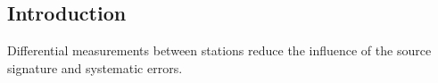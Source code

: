 \renewcommand{\pmk}{YuanYH\_2016\_GJI\_Double-difference adjoint tomography}
\renewcommand{\prf}{FWI/\pmk.pdf}
\renewcommand{\pti}{Double-difference adjoint seismic tomography}
\renewcommand{\pay}{Yanhua O. Yuan, Frederik J. Simons and Jeroen Tromp, 2016}
\renewcommand{\pjo}{Geophys. J. Int.}
\renewcommand{\pda}{2019/8/25 Sun.}

\section{\pinfo}

\subsection{Introduction}
Differential measurements between stations reduce the influence of
the source signature and systematic errors.

